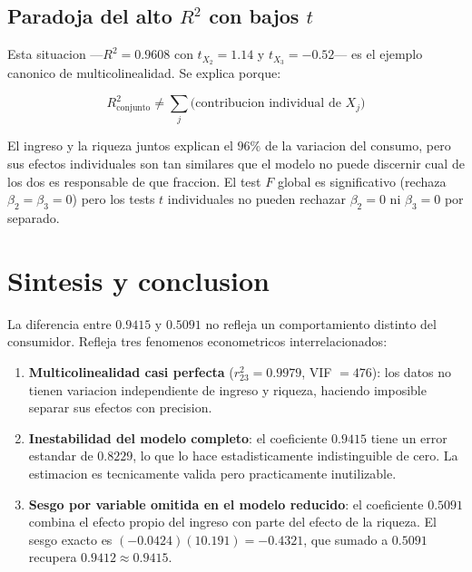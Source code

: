 \documentclass[12pt, letterpaper]{article}
\theoremstyle{remark}
\begin{document}
\subsection{Paradoja del alto $R^2$ con bajos $t$}

Esta situacion ---$R^2 = 0.9608$ con $t_{X_2} = 1.14$ y $t_{X_3} = -0.52$---
es el ejemplo canonico de multicolinealidad. Se explica porque:

\begin{equation}
  R^2_{\text{conjunto}} \neq \sum_j \text{(contribucion individual de } X_j\text{)}
  \label{eq:paradoja}
\end{equation}

El ingreso y la riqueza juntos explican el $96\%$ de la variacion del consumo,
pero sus efectos individuales son tan similares que el modelo no puede discernir
cual de los dos es responsable de que fraccion. El test $F$ global es significativo
(rechaza $\beta_2 = \beta_3 = 0$) pero los tests $t$ individuales no pueden
rechazar $\beta_2 = 0$ ni $\beta_3 = 0$ por separado.

\section{Sintesis y conclusion}

La diferencia entre $0.9415$ y $0.5091$ no refleja un comportamiento distinto
del consumidor. Refleja tres fenomenos econometricos interrelacionados:

\begin{enumerate}[leftmargin=1.8em, itemsep=6pt]
  \item \textbf{Multicolinealidad casi perfecta} ($r_{23}^2 = 0.9979$,
    VIF $= 476$): los datos no tienen variacion independiente de ingreso y
    riqueza, haciendo imposible separar sus efectos con precision.

  \item \textbf{Inestabilidad del modelo completo}: el coeficiente $0.9415$
    tiene un error estandar de $0.8229$, lo que lo hace estadisticamente
    indistinguible de cero. La estimacion es tecnicamente valida pero
    practicamente inutilizable.

  \item \textbf{Sesgo por variable omitida en el modelo reducido}: el
    coeficiente $0.5091$ combina el efecto propio del ingreso con parte
    del efecto de la riqueza. El sesgo exacto es $(-0.0424)(10.191) = -0.4321$,
    que sumado a $0.5091$ recupera $0.9412 \approx 0.9415$.
\end{enumerate}
\end{document}
